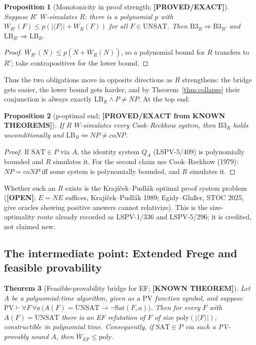 \documentclass[11pt]{article}
\newtheorem{theorem}{Theorem}
\newtheorem{proposition}[theorem]{Proposition}
\theoremstyle{definition}
\theoremstyle{remark}
\newcommand{\SAT}{\mathrm{SAT}}
\newcommand{\UNSAT}{\mathrm{UNSAT}}
\newcommand{\Wbar}{\overline W}
\newcommand{\poly}{\mathrm{poly}}
\newcommand{\status}[1]{\textbf{[#1]}}
\begin{document}
\begin{proposition}[Monotonicity in proof strength; \status{PROVED/EXACT}]\label{prop:mono}
Suppose $R'$ $W$-simulates $R$: there is a polynomial $p$ with
$W_{R'}(F)\le p(|\langle F\rangle|+W_R(F))$ for all $F\in\UNSAT$. Then
$\mathrm{B3}_R\Rightarrow\mathrm{B3}_{R'}$ and $\mathrm{LB}_{R'}\Rightarrow\mathrm{LB}_R$.
\end{proposition}

\begin{proof}
$\Wbar_{R'}(N)\le p(N+\Wbar_R(N))$, so a polynomial bound for $R$ transfers to $R'$;
take contrapositives for the lower bound.
\end{proof}

Thus the two obligations move in opposite directions as $R$ strengthens:
the bridge gets easier, the lower bound gets harder, and by
Theorem~\ref{thm:collapse} their conjunction is always exactly
$\mathrm{LB}_R\wedge P\ne NP$. At the top end:

\begin{proposition}[p-optimal end; \status{PROVED/EXACT from KNOWN THEOREMS}]\label{prop:opt}
If $R$ $W$-simulates every Cook--Reckhow system, then $\mathrm{B3}_R$ holds
unconditionally and $\mathrm{LB}_R\iff NP\ne coNP$.
\end{proposition}

\begin{proof}
If $\SAT\in P$ via $A$, the identity system $Q_A$ (LSPV-5/409) is polynomially
bounded and $R$ simulates it. For the second claim use Cook--Reckhow (1979):
$NP=coNP$ iff some system is polynomially bounded, and $R$ simulates it.
\end{proof}

Whether such an $R$ exists is the Kraj\'i\v{c}ek--Pudl\'ak optimal proof
system problem (\status{OPEN}; $E=NE$ suffices, Kraj\'i\v{c}ek--Pudl\'ak 1989;
Egidy--Gla\ss{}er, STOC 2025, give oracles showing positive answers cannot
relativize). This is the size-optimality route already recorded as LSPV-1/336
and LSPV-5/296; it is credited, not claimed new.

\subsection{The intermediate point: Extended Frege and feasible provability}

\begin{theorem}[Feasible-provability bridge for EF; \status{KNOWN THEOREM}]\label{thm:ef}
Let $A$ be a polynomial-time algorithm, given as a $\mathrm{PV}$ function symbol,
and suppose $\mathrm{PV}\vdash \forall F\,\forall a\,
\bigl(A(F)=\UNSAT\rightarrow \neg\mathrm{Sat}(F,a)\bigr)$. Then for every $F$
with $A(F)=\UNSAT$ there is an EF refutation of $F$ of size
$\poly(|\langle F\rangle|)$, constructible in polynomial time.
Consequently, if $\SAT\in P$ via such a PV-provably sound $A$, then
$\Wbar_{EF}\le\poly$.
\end{theorem}
\end{document}
